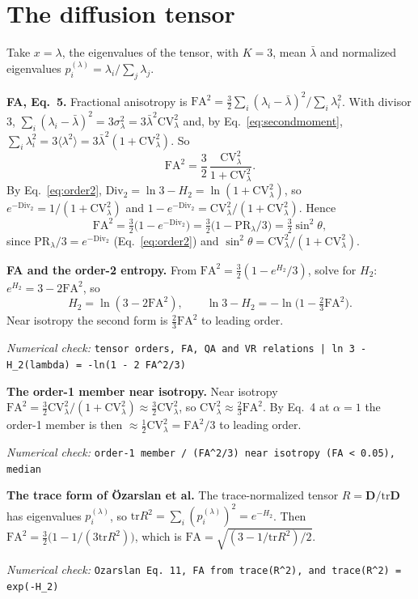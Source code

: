 \documentclass[11pt]{article}
\newcommand{\Div}{\mathrm{Div}}
\newcommand{\CV}{\mathrm{CV}}
\newcommand{\PR}{\mathrm{PR}}
\newcommand{\FA}{\mathrm{FA}}
\newcommand{\tr}{\mathrm{tr}}
\newcommand{\numcheck}[1]{\par{\small\raggedright\noindent\textit{Numerical check:} \texttt{#1}\par}}
\begin{document}
\section{The diffusion tensor}

Take $x=\lambda$, the eigenvalues of the tensor, with $K=3$, mean $\bar\lambda$ and normalized eigenvalues
$p^{(\lambda)}_i = \lambda_i/\sum_j\lambda_j$.

\textbf{FA, Eq.~5.} Fractional anisotropy is $\FA^2 = \tfrac32\sum_i(\lambda_i-\bar\lambda)^2/\sum_i\lambda_i^2$. With
divisor 3, $\sum_i(\lambda_i-\bar\lambda)^2 = 3\sigma_\lambda^2 = 3\bar\lambda^2\CV_\lambda^2$ and, by
Eq.~\eqref{eq:secondmoment}, $\sum_i\lambda_i^2 = 3\langle\lambda^2\rangle = 3\bar\lambda^2(1+\CV_\lambda^2)$. So
\begin{equation}
\FA^2 = \frac32\,\frac{\CV_\lambda^2}{1+\CV_\lambda^2} .
\end{equation}
By Eq.~\eqref{eq:order2}, $\Div_2 = \ln3 - H_2 = \ln(1+\CV_\lambda^2)$, so $e^{-\Div_2} = 1/(1+\CV_\lambda^2)$ and
$1-e^{-\Div_2} = \CV_\lambda^2/(1+\CV_\lambda^2)$. Hence
\begin{equation}
\FA^2 = \tfrac32\bigl(1-e^{-\Div_2}\bigr) = \tfrac32\bigl(1-\PR_\lambda/3\bigr) = \tfrac32\sin^2\theta ,
\end{equation}
since $\PR_\lambda/3 = e^{-\Div_2}$ (Eq.~\eqref{eq:order2}) and $\sin^2\theta = \CV_\lambda^2/(1+\CV_\lambda^2)$.

\textbf{FA and the order-2 entropy.} From $\FA^2 = \tfrac32(1 - e^{H_2}/3)$, solve for $H_2$:
$e^{H_2} = 3 - 2\FA^2$, so
\begin{equation}
H_2 = \ln(3-2\FA^2), \qquad \ln3 - H_2 = -\ln\bigl(1 - \tfrac23\FA^2\bigr) .
\end{equation}
Near isotropy the second form is $\tfrac23\FA^2$ to leading order.
\numcheck{tensor orders, FA, QA and VR relations | ln 3 - H\_2(lambda) = -ln(1 - 2 FA\^{}2/3)}

\textbf{The order-1 member near isotropy.} Near isotropy $\FA^2 = \tfrac32\CV_\lambda^2/(1+\CV_\lambda^2) \approx
\tfrac32\CV_\lambda^2$, so $\CV_\lambda^2\approx\tfrac23\FA^2$. By Eq.~4 at $\alpha=1$ the order-1 member is then
$\approx\tfrac12\CV_\lambda^2 = \FA^2/3$ to leading order.
\numcheck{order-1 member / (FA\^{}2/3) near isotropy (FA < 0.05), median}

\textbf{The trace form of \"Ozarslan et al.} The trace-normalized tensor $R = \mathbf D/\tr\mathbf D$ has eigenvalues
$p^{(\lambda)}_i$, so $\tr R^2 = \sum_i(p^{(\lambda)}_i)^2 = e^{-H_2}$. Then
$\FA^2 = \tfrac32\bigl(1 - 1/(3\tr R^2)\bigr)$, which is $\FA = \sqrt{(3-1/\tr R^2)/2}$.
\numcheck{Ozarslan Eq. 11, FA from trace(R\^{}2), and trace(R\^{}2) = exp(-H\_2)}
\end{document}
